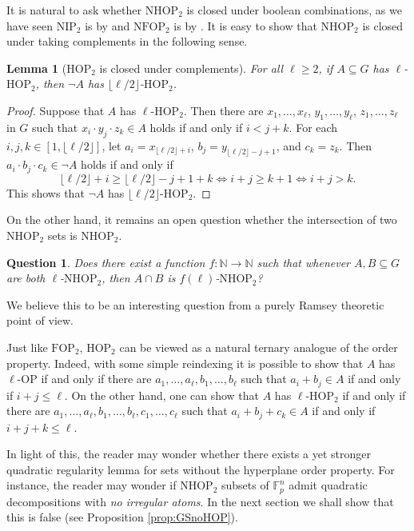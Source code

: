 \documentclass[12pt,oneside,british,a4wide]{amsart}
\newtheorem{lemma}[theorem]{Lemma}
\newtheorem{question}[theorem]{Question}
\numberwithin{equation}{section}
\theoremstyle{definition}
\def\F{\mathbb{F}}
\def\OP{\mathrm{OP}}
\def\FOP{\mathrm{FOP}}
\def\NFOP{\mathrm{NFOP}}
\def\NIP{\mathrm{NIP}}
\def\HOP{\mathrm{HOP}}
\def\NHOP{\mathrm{NHOP}}
\begin{document}
It is natural to ask whether $\NHOP_2$ is closed under boolean combinations, as we have seen $\NIP_2$ is by \cite{Chernikov.2019} and $\NFOP_2$ is by \cite{Terry.2021b}. It is easy to show that $\NHOP_2$ is closed under taking complements in the following sense.

\begin{lemma}[$\HOP_2$ is closed under complements]\label{lem:negations}
For all $\ell\geq 2$, if $A\subseteq G$ has $\ell$-$\HOP_2$, then $\neg A$ has $\lfloor \ell /2\rfloor$-$\HOP_2$. 
\end{lemma}
\begin{proof}
Suppose that $A$ has $\ell$-$\HOP_2$.  Then there are $x_1, \dots,x_\ell$, $y_1,\dots,y_\ell$, $z_1,\dots,z_\ell$ in $G$ such that $x_i\cdot y_j\cdot z_k\in A$ holds if and only if $i< j+k$.  For each $i,j,k\in [1,\lfloor\ell/2\rfloor]$, let $a_i=x_{\lfloor\ell/2\rfloor+i}$, $b_j=y_{\lfloor\ell/2\rfloor-j+1}$, and $c_k=z_k$.  Then $a_i\cdot b_j\cdot c_k\in \neg A$ holds if and only if 
\[\lfloor\ell/2\rfloor+i\geq \lfloor\ell/2\rfloor-j+1+k\Leftrightarrow i+j\geq k+1 \Leftrightarrow i+j>k.\]
This shows that $\neg A$ has $\lfloor \ell/2\rfloor$-$\HOP_2$.
\end{proof}

On the other hand, it remains an open question whether the intersection of two $\NHOP_2$ sets is $\NHOP_2$.  

\begin{question}\label{ques:inthop}
Does there exist a function $f:\mathbb{N}\rightarrow \mathbb{N}$ such that whenever $A,B\subseteq G$ are both $\ell$-$\NHOP_2$, then $A\cap B$ is $f(\ell)$-$\NHOP_2$?
\end{question}

We believe this to be an interesting question from a purely Ramsey theoretic point of view.  

Just like $\FOP_2$, $\HOP_2$ can be viewed as a natural ternary analogue of the order property. Indeed, with some simple reindexing it is possible to show that $A$ has $\ell$-$\OP$ if and only if there are $a_1,\ldots, a_\ell,b_1,\ldots, b_\ell$ such that $a_i+b_j\in A$ if and only if $i+j\leq \ell$.  On the other hand, one can show that $A$ has $\ell$-$\HOP_2$ if and only if there are $a_1,\ldots, a_\ell,b_1,\ldots, b_\ell,c_1,\ldots, c_\ell$ such that $a_i+b_j+c_k\in A$ if and only if $i+j+k\leq \ell$. 

In light of this, the reader may wonder whether there exists a yet stronger quadratic regularity lemma for sets without the hyperplane order property.  For instance, the reader may wonder if $\NHOP_2$ subsets of $\F_p^n$ admit quadratic decompositions with \emph{no irregular atoms}.  In the next section we shall show that this is false (see Proposition \ref{prop:GSnoHOP}). 
\end{document}
